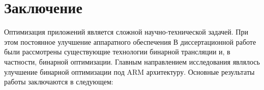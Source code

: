 \chapter*{Заключение}                       %


Оптимизация приложений является сложной научно-технической задачей. При этом постоянное улучшение аппаратного обеспечения 
В диссертационной работе были рассмотрены существующие технологии бинарной трансляции и, в частности, бинарной оптимизации. Главным направлением исследования являлось улучшение бинарной оптимизации под ARM архитектуру.
Основные результаты работы заключаются в следующем:

